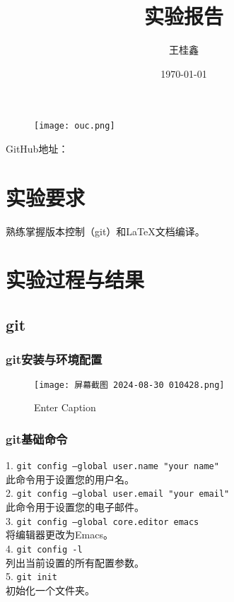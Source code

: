 \documentclass[a4paper,12pt]{article}
\begin{document}
  
\begin{figure}
    \centering
    \texttt{[image: ouc.png]}
    \label{fig:enter-label}
\end{figure}
 \title{实验报告}  
 \author{王桂鑫}  
 \date{\today}  
 \maketitle  
GitHub地址：
\section{\color{blue}实验要求}  
熟练掌握版本控制（git）和LaTeX文档编译。  

\section{\color{red}实验过程与结果}  
\subsection{git} 
\subsubsection{git安装与环境配置}
\begin{figure}[H]
    \centering
    \texttt{[image: 屏幕截图 2024-08-30 010428.png]}
    \caption{Enter Caption}
    \label{fig:git官网}
\end{figure}
\subsubsection{git基础命令}
1. \texttt{git config --global user.name "your name"} \\
  此命令用于设置您的用户名。\\

2. \texttt{git config --global user.email "your email"} \\
  此命令用于设置您的电子邮件。\\

3. \texttt{git config --global core.editor emacs} \\
  将编辑器更改为Emacs。\\

4. \texttt{git config -l} \\
  列出当前设置的所有配置参数。\\

5. \texttt{git init} \\
  初始化一个文件夹。\\
\end{document}
